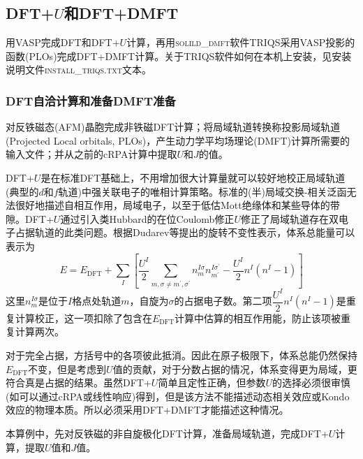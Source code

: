 \subsection{\rm{DFT+}$U$和\rm{DFT+DMFT}}
用\textrm{VASP}完成\textrm{DFT}和\textrm{DFT+}$U$计算，再用\textsc{solild\_dmft}软件\textrm{TRIQS}采用\textrm{VASP}投影的函数\textrm{(PLOs)}完成\textrm{DFT+DMFT}计算。关于\textsc{TRIQS}软件如何在本机上安装，见安装说明文件\textsc{install\_triqs.txt}文本。

\subsubsection{\rm{DFT}自洽计算和准备\rm{DMFT}准备}
对反铁磁态\textrm{(AFM)}晶胞完成非铁磁\textrm{DFT}计算；将局域轨道转换称投影局域轨道\textrm{(Projected Local orbitals, PLOs)}，产生动力学平均场理论\textrm{(DMFT)}计算所需要的输入文件；并从之前的\textrm{cRPA}计算中提取$U$和$J$的值。

\textrm{DFT+}$U$是在标准\textrm{DFT}基础上，不用增加很大计算量就可以较好地校正局域轨道(典型的$d$和$f$轨道)中强关联电子的唯相计算策略。标准的(半)局域交换-相关泛函无法很好地描述自相互作用，局域电子，以至于低估\textrm{Mott}绝缘体和某些导体的带隙。\textrm{DFT+}$U$通过引入类\textrm{Hubbard}的在位\textrm{Coulomb}修正$U$修正了局域轨道存在双电子占据轨道的此类问题。根据\textrm{Dudarev}等提出的旋转不变性表示，体系总能量可以表示为
\begin{displaymath}
	E=E_{\mathrm{DFT}}+\sum_I\left[\dfrac{U^I}2\sum_{m,\sigma\neq m^{\prime},\sigma^{\prime}}n_m^{I\sigma}n_{m^{\prime}}^{I\sigma^{\prime}}-\dfrac{U^I}2n^I(n^I-1)\right]
\end{displaymath}
这里$n_m^{I\sigma}$是位于$I$格点处轨道$m$，自旋为$\sigma$的占据电子数。第二项$\dfrac{U^I}2n^I(n^I-1)$是重复计算校正，这一项扣除了包含在$E_{\mathrm{DFT}}$计算中估算的相互作用能，防止该项被重复计算两次。

对于完全占据，方括号中的各项彼此抵消。因此在原子极限下，体系总能仍然保持$E_{\mathrm{DFT}}$不变，但是考虑到$U$值的贡献，对于分数占据的情况，体系变得更为局域，更符合真是占据的结果。虽然\textrm{DFT+}$U$简单且定性正确，但参数$U$的选择必须很审慎(如可以通过\textrm{cRPA}或线性响应)得到，但是该方法不能描述动态相关效应或\textrm{Kondo}效应的物理本质。所以必须采用\textrm{DFT+DMFT}才能描述这种情况。

本算例中，先对反铁磁的非自旋极化\textrm{DFT}计算，准备局域轨道，完成\textrm{DFT+}$U$计算，提取$U$值和$J$值。

